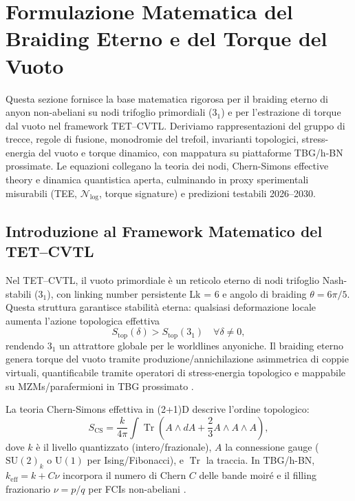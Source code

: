 \documentclass[11pt,a4paper]{article}
\let\oldcite\cite
\renewcommand{\cite}{\protect\oldcite}
\theoremstyle{plain}
\theoremstyle{definition}
\begin{document}
\section{Formulazione Matematica del Braiding Eterno e del Torque del Vuoto}

Questa sezione fornisce la base matematica rigorosa per il braiding eterno di anyon non-abeliani su nodi trifoglio primordiali (3$_1$) e per l'estrazione di torque dal vuoto nel framework TET--CVTL. Deriviamo rappresentazioni del gruppo di trecce, regole di fusione, monodromie del trefoil, invarianti topologici, stress-energia del vuoto e torque dinamico, con mappatura su piattaforme TBG/h-BN prossimate. Le equazioni collegano la teoria dei nodi, Chern-Simons effective theory e dinamica quantistica aperta, culminando in proxy sperimentali misurabili (TEE, $\mathcal{N}_{\log}$, torque signature) e predizioni testabili 2026–2030.

\subsection{Introduzione al Framework Matematico del TET--CVTL}

Nel TET--CVTL, il vuoto primordiale è un reticolo eterno di nodi trifoglio Nash-stabili (3$_1$), con linking number persistente Lk = 6 e angolo di braiding $\theta = 6\pi/5$. Questa struttura garantisce stabilità eterna: qualsiasi deformazione locale aumenta l'azione topologica effettiva
\begin{equation}
S_{\text{top}}(\delta) > S_{\text{top}}(3_1) \quad \forall \delta \neq 0,
\end{equation}
rendendo $3_1$ un attrattore globale per le worldlines anyoniche. Il braiding eterno genera torque del vuoto tramite produzione/annichilazione asimmetrica di coppie virtuali, quantificabile tramite operatori di stress-energia topologico e mappabile su MZMs/parafermioni in TBG prossimato \cite{Nayak2008, Kitaev2003, PhysSoliman2026Eternal}.

La teoria Chern-Simons effettiva in (2+1)D descrive l'ordine topologico:
\begin{equation}
S_{\mathrm{CS}} = \frac{k}{4\pi} \int \operatorname{Tr} \left( A \wedge dA + \frac{2}{3} A \wedge A \wedge A \right),
\label{eq:chern-simons-action}
\end{equation}
dove $k$ è il livello quantizzato (intero/frazionale), $A$ la connessione gauge ($\mathrm{SU}(2)_k$ o $\mathrm{U}(1)$ per Ising/Fibonacci), e $\operatorname{Tr}$ la traccia. In TBG/h-BN, $k_{\text{eff}} = k + C\nu$ incorpora il numero di Chern $C$ delle bande moiré e il filling frazionario $\nu = p/q$ per FCIs non-abeliani \cite{MooreRead1991, AliceaFendley2016}.
\end{document}
